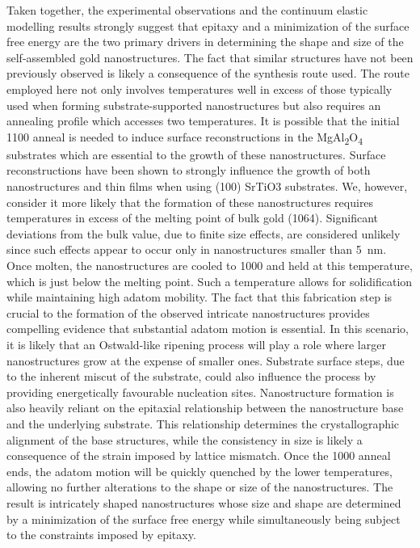Taken together, the experimental observations and the continuum elastic modelling results strongly suggest that epitaxy and a minimization of the surface free energy are the two primary drivers in determining the shape and size of the self-assembled gold nanostructures.
The fact that similar structures have not been previously observed is likely a consequence of the synthesis route used.
The route employed here not only involves temperatures well in excess of those typically used when forming substrate-supported nanostructures but also requires an annealing profile which accesses two temperatures.
It is possible that the initial 1100\celsius{} anneal is needed to induce surface reconstructions in the MgAl\textsubscript{2}O\textsubscript{4} substrates which are essential to the growth of these nanostructures.
Surface reconstructions have been shown to strongly influence the growth of both nanostructures\cite{RefWorks:24,RefWorks:16,RefWorks:104} and thin films\cite{Neretina2009a} when using (100) SrTiO3 substrates.
We, however, consider it more likely that the formation of these nanostructures requires temperatures in excess of the melting point of bulk gold (1064\celsius{}).
Significant deviations from the bulk value, due to finite size effects, are considered unlikely since such effects appear to occur only in nanostructures smaller than 5~nm\cite{RefWorks:43}.
Once molten, the nanostructures are cooled to 1000\celsius{} and held at this temperature, which is just below the melting point.
Such a temperature allows for solidification while maintaining high adatom mobility.
The fact that this fabrication step is crucial to the formation of the observed intricate nanostructures provides compelling evidence that substantial adatom motion is essential.
In this scenario, it is likely that an Ostwald-like ripening process will play a role where larger nanostructures grow at the expense of smaller ones.
Substrate surface steps, due to the inherent miscut of the substrate\cite{RefWorks:69}, could also influence the process by providing energetically favourable nucleation sites.
Nanostructure formation is also heavily reliant on the epitaxial relationship between the nanostructure base and the underlying substrate.
This relationship determines the crystallographic alignment of the base structures, while the consistency in size is likely a consequence of the strain imposed by lattice mismatch.
Once the 1000\celsius{} anneal ends, the adatom motion will be quickly quenched by the lower temperatures, allowing no further alterations to the shape or size of the nanostructures.
The result is intricately shaped nanostructures whose size and shape are determined by a minimization of the surface free energy while simultaneously being subject to the constraints imposed by epitaxy.
